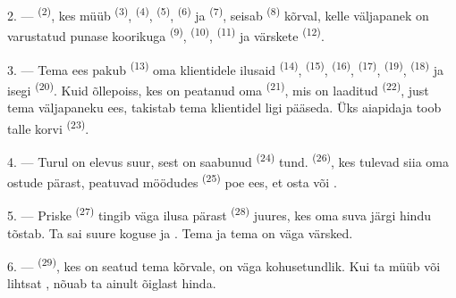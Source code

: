 2. ---  \textsuperscript{(2)}, kes müüb 
\textsuperscript{(3)},  \textsuperscript{(4)}, 
\textsuperscript{(5)},  \textsuperscript{(6)} ja 
\textsuperscript{(7)}, seisab  \textsuperscript{(8)} kõrval,
kelle väljapanek on varustatud punase koorikuga 
\textsuperscript{(9)},  \textsuperscript{(10)},
 \textsuperscript{(11)} ja värskete 
\textsuperscript{(12)}.

3. --- Tema ees pakub  \textsuperscript{(13)} oma klientidele
ilusaid  \textsuperscript{(14)}, 
\textsuperscript{(15)},  \textsuperscript{(16)}, 
\textsuperscript{(17)},  \textsuperscript{(19)}, 
\textsuperscript{(18)} ja isegi  \textsuperscript{(20)}. Kuid õllepoiss, kes
on peatanud oma  \textsuperscript{(21)}, mis on laaditud
 \textsuperscript{(22)}, just tema väljapaneku ees, takistab tema
klientidel ligi pääseda. Üks aiapidaja toob talle korvi 
\textsuperscript{(23)}.

\VUsaut{4.0mm}
\VUsaut{3.0mm}

4. --- Turul on elevus suur, sest on saabunud 
\textsuperscript{(24)} tund.  \textsuperscript{(26)}, kes tulevad siia
oma ostude pärast, peatuvad möödudes  \textsuperscript{(25)} poe ees,
et osta  või .

5. --- Priske  \textsuperscript{(27)} tingib väga ilusa
 pärast  \textsuperscript{(28)} juures, kes oma
suva järgi hindu tõstab. Ta sai suure koguse  ja
. Tema  ja tema  on väga värsked.

\VUsaut{4.0mm}
\VUsaut{3.0mm}

6. ---  \textsuperscript{(29)}, kes on seatud tema kõrvale, on väga
kohusetundlik. Kui ta müüb  või lihtsat
, nõuab ta ainult õiglast hinda.

